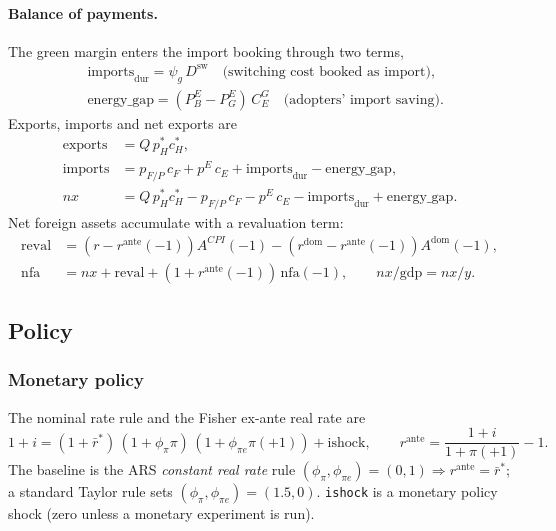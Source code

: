\documentclass[11pt,a4paper]{article}
\newcommand{\dsw}{D^{\mathrm{sw}}}
\newcommand{\PEB}{P^{E}_{B}}
\newcommand{\PEG}{P^{E}_{G}}
\newcommand{\pE}{p^{E}}
\begin{document}
\paragraph{Balance of payments.}\label{sec:bop}
The green margin enters the import booking through two terms,
\begin{align}
&\text{imports}_{\text{dur}}=\psi_g\,\dsw
\quad\text{(switching cost booked as import)},\\
&\text{energy\_gap}=(\PEB-\PEG)\,C^{G}_{E}
\quad\text{(adopters' import saving)}.
\end{align}
Exports, imports and net exports are
\begin{align}
\text{exports}&=Q\,p_H^{*}c_H^{*},\\
\text{imports}&=p_{F/P}\,c_F+\pE\,c_E+\text{imports}_{\text{dur}}-\text{energy\_gap},\\
nx&=Q\,p_H^{*}c_H^{*}-p_{F/P}\,c_F-\pE\,c_E-\text{imports}_{\text{dur}}+\text{energy\_gap}.
\end{align}
Net foreign assets accumulate with a revaluation term:
\begin{align}
\text{reval} &= (r-r^{\text{ante}}(-1))A^{CPI}(-1)-(r^{\text{dom}}-r^{\text{ante}}(-1))A^{\text{dom}}(-1),\\
\mathrm{nfa} &= nx+\text{reval}+(1+r^{\text{ante}}(-1))\,\mathrm{nfa}(-1),
\qquad nx/\mathrm{gdp}=nx/y. \label{eq:nfa}
\end{align}

\subsection{Policy}\label{sec:policy}

\subsubsection{Monetary policy}

The nominal rate rule and the Fisher ex-ante real rate are
\begin{equation}
1+i = (1+\bar r^{*})\,(1+\phi_\pi\pi)\,(1+\phi_{\pi e}\pi(+1))+\text{ishock},
\qquad
r^{\text{ante}} = \frac{1+i}{1+\pi(+1)}-1.
\end{equation}
The baseline is the ARS \emph{constant real rate} rule
$(\phi_\pi,\phi_{\pi e})=(0,1)\Rightarrow r^{\text{ante}}=\bar r^{*}$; a standard
Taylor rule sets $(\phi_\pi,\phi_{\pi e})=(1.5,0)$. \texttt{ishock} is a monetary
policy shock (zero unless a monetary experiment is run).
\end{document}
